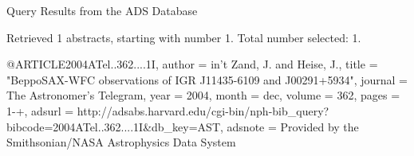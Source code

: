 Query Results from the ADS Database


Retrieved 1 abstracts, starting with number 1.  Total number selected: 1.

@ARTICLE{2004ATel..362....1I,
   author = {{in't Zand}, J. and {Heise}, J.},
    title = "{BeppoSAX-WFC observations of IGR J11435-6109 and J00291+5934}",
  journal = {The Astronomer's Telegram},
     year = 2004,
    month = dec,
   volume = 362,
    pages = {1-+},
   adsurl = {http://adsabs.harvard.edu/cgi-bin/nph-bib_query?bibcode=2004ATel..362....1I&db_key=AST},
  adsnote = {Provided by the Smithsonian/NASA Astrophysics Data System}
}


